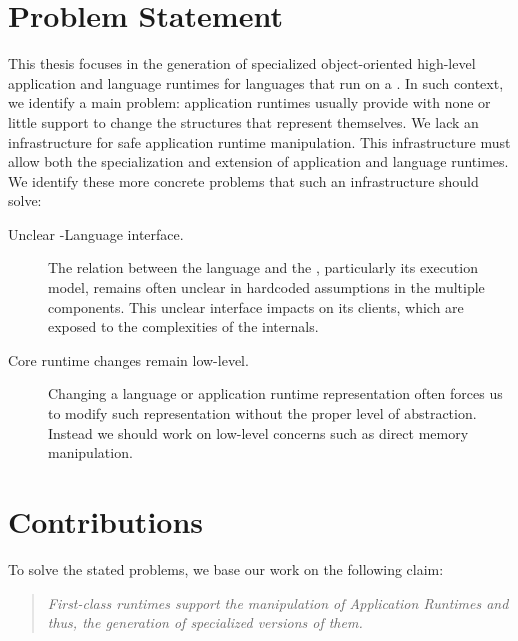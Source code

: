 \section{Problem Statement}

This thesis focuses in the generation of specialized object-oriented high-level application and language runtimes for languages that run on a \VM. In such context, we identify a main problem: application runtimes usually provide with none or little support to change the structures that represent themselves. We lack an infrastructure for safe application runtime manipulation. This infrastructure must allow both the specialization and extension of application and language runtimes. We identify these more concrete problems that such an infrastructure should solve:
\begin{description}
\item[Unclear \VM-Language interface.] The relation between the language and the \VM, particularly its execution model, remains often unclear in \VM hardcoded assumptions in the multiple \VM components. This unclear interface impacts on its clients, which are exposed to the complexities of the \VM internals.

\item[Core runtime changes remain low-level.] Changing a language or application runtime representation often forces us to modify such representation without the proper level of abstraction. Instead we should work on low-level concerns such as direct memory manipulation.


\end{description}

\section{Contributions}

To solve the stated problems, we base our work on the following claim: \newline

\blockquote{\emph{First-class runtimes support the manipulation of Application Runtimes and thus, the generation of specialized versions of them.}}\newline

